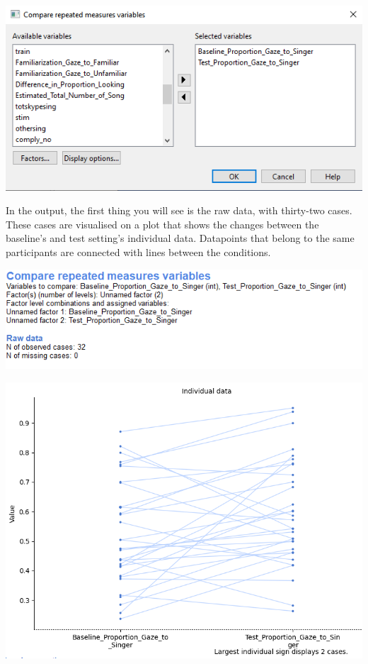 \documentclass[
]{book}
\begin{document}
\includegraphics{img/ch6/6.7comparerepeatedmeasures_window.png}

In the output, the first thing you will see is the raw data, with thirty-two cases. These cases are visualised on a plot that shows the changes between the baseline's and test setting's individual data. Datapoints that belong to the same participants are connected with lines between the conditions.

\includegraphics{img/ch6/6.7comparerepeatedmeasures_info.png}

\includegraphics{img/ch6/6.7comparerepeatedmeasures_raw.png}
\end{document}
